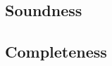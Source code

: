 \subsection{Soundness}

\begin{lemma}[\TypeSanitizationExtensionName]
  \TypeSanitizationExtensionBody
\end{lemma}

\begin{lemma}[\TypeSanitizationEquivalenceName]
  \TypeSanitizationEquivalenceBody
\end{lemma}

\begin{lemma}[\TypeSanitizationWellFormednessName]
  \TypeSanitizationWellFormednessBody
\end{lemma}

\begin{lemma}[\UnificationExtensionName]\leavevmode
  \UnificationExtensionBody
\end{lemma}

\begin{lemma}[\UnificationEquivalenceName]\leavevmode
  \UnificationEquivalenceBody
\end{lemma}

\subsection{Completeness}

\begin{lemma}[\TypeSanitizationCompletenessName]\leavevmode
  \TypeSanitizationCompletenessBody
\end{lemma}

\begin{corollary}[\TypeSanitizationCompletenessPrettyName]
  \TypeSanitizationCompletenessPrettyBody
\end{corollary}

\begin{lemma}[\TypeSanitizationCompletenessUnificationName]\leavevmode
  \TypeSanitizationCompletenessUnificationBody
\end{lemma}

\begin{lemma}[\UnificationCompletenessName]
  \label{lemma:\UnificationCompletenessName}
    \UnificationCompletenessBody
\end{lemma}
